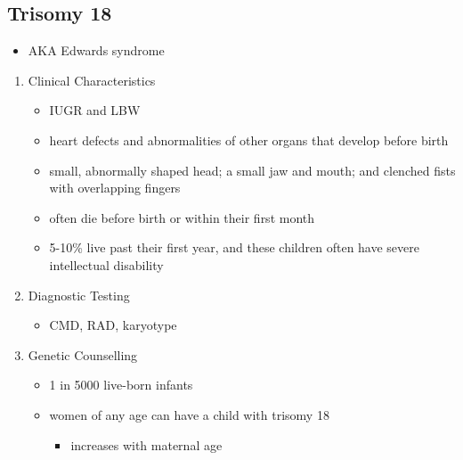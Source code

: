 \documentclass[12pt]{scrartcl}
\begin{document}
\subsection{Trisomy 18}
\label{sec:org8d2a48e}
\begin{itemize}
\item AKA Edwards syndrome
\end{itemize}
\begin{enumerate}
\item Clinical Characteristics
\label{sec:orga69cdaf}
\begin{itemize}
\item IUGR and LBW
\item heart defects and abnormalities of other organs that develop before birth
\item small, abnormally shaped head; a small jaw and mouth; and clenched fists with overlapping fingers
\item often die before birth or within their first month
\item 5-10\% live past their first year, and these children often have
severe intellectual disability
\end{itemize}

\item Diagnostic Testing
\label{sec:org6c35635}
\begin{itemize}
\item CMD, RAD, karyotype
\end{itemize}

\item Genetic Counselling
\label{sec:orgc0406b1}
\begin{itemize}
\item 1 in 5000 live-born infants
\item women of any age can have a child with trisomy 18
\begin{itemize}
\item increases with maternal age
\end{itemize}
\end{itemize}
\end{enumerate}
\end{document}
